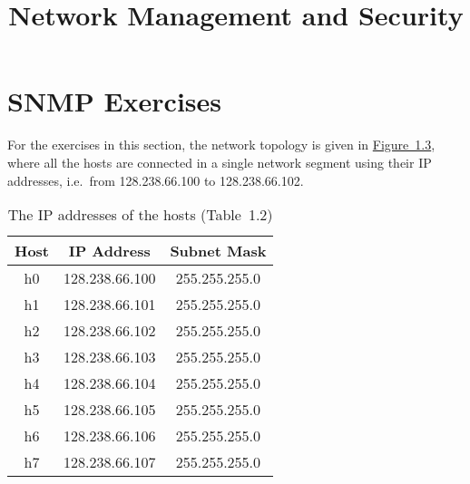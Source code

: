 \documentclass{../UTNetLab}
\title{Network Management and Security}
\begin{document}
\part{SNMP Exercises}
For the exercises in this section, the network topology is given in \hyperref[fig:1.3]{Figure~1.3}, where all the hosts are connected in a single network segment using their IP addresses, i.e.\  from 128.238.66.100 to 128.238.66.102.

\begin{center}
    \begin{minipage}{0.48\textwidth}
        \begin{flushleft}
            \begin{table}[H]
                \caption{The IP addresses of the hosts (Table~1.2)}
                \centering
                \begin{tabular}{ c c c }
                    \hline \hline
                    Host & IP Address     & Subnet Mask   \\
                    \hline
                    h0   & 128.238.66.100 & 255.255.255.0 \\
                    h1   & 128.238.66.101 & 255.255.255.0 \\
                    h2   & 128.238.66.102 & 255.255.255.0 \\
                    h3   & 128.238.66.103 & 255.255.255.0 \\
                    h4   & 128.238.66.104 & 255.255.255.0 \\
                    h5   & 128.238.66.105 & 255.255.255.0 \\
                    h6   & 128.238.66.106 & 255.255.255.0 \\
                    h7   & 128.238.66.107 & 255.255.255.0 \\
                    \hline \hline
                \end{tabular}
            \end{table}
        \end{flushleft}
    \end{minipage}
    \begin{minipage}{0.48\textwidth}
        \begin{flushright}
            \begin{figure}[H]
                \centering
\end{figure}
\end{flushright}
\end{minipage}
\end{center}
\end{document}
